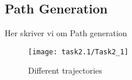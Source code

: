 \subsection{Path Generation}\label{sec:prob2.1}
Her skriver vi om Path generation
\begin{figure}[h]
    \centering
     \texttt{[image: task2.1/Task2\_1]}
    \caption{Different trajectories}
    \label{fig:task2_1}
\end{figure}